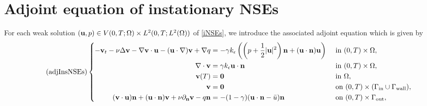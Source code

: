 \documentclass[oneside,11pt]{book}
\numberwithin{equation}{section}
\begin{document}
\section{Adjoint equation of instationary NSEs}
For each weak solution $({\bf u},p)\in V(0,T;\Omega)\times L^2(0,T;L^2(\Omega))$ of \eqref{iNSEs}, we introduce the associated adjoint equation which is given by
\begin{equation}
    \label{adjoint insNSEs}
    \tag{adjInsNSEs}
    \left\{\begin{split}
        -{\bf v}_t - \nu\Delta{\bf v} - \nabla{\bf v}\cdot{\bf u} - ({\bf u}\cdot\nabla){\bf v} + \nabla q &= -\gamma k_\epsilon\left(\left(p + \frac{1}{2}|{\bf u}|^2\right){\bf n} + ({\bf u}\cdot{\bf n}){\bf u}\right) &&\mbox{ in } (0,T)\times\Omega,\\
        \nabla\cdot{\bf v} &= \gamma k_\epsilon{\bf u}\cdot{\bf n} &&\mbox{ in } (0,T)\times\Omega,\\
        {\bf v}(T) &= {\bf 0} &&\mbox{ in } \Omega,\\
        {\bf v} &= {\bf 0} &&\mbox{ on } (0,T)\times(\Gamma_{\rm in}\cup\Gamma_{\rm wall}),\\
        ({\bf v}\cdot{\bf u}){\bf n} + ({\bf u}\cdot{\bf n}){\bf v} + \nu\partial_{\bf n}{\bf v} - q{\bf n} &= -(1 - \gamma)({\bf u}\cdot{\bf n} - \bar{u}){\bf n} &&\mbox{ on } (0,T)\times\Gamma_{\rm out},
    \end{split}\right.    
\end{equation}
\end{document}
